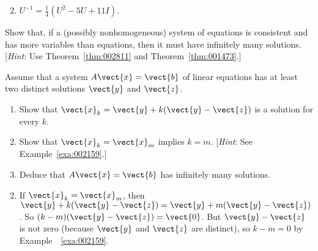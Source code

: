 \begin{multicols}{2}
\begin{supex}
\begin{enumerate}[label={\alph*.}]
\end{enumerate}
\begin{supsol}
\begin{enumerate}[label={\alph*.}]
\setcounter{enumi}{1}
\item  $U^{-1} = \frac{1}{4}(U^{2} - 5U + 11I)$.

\end{enumerate}
\end{supsol}
\end{supex}

\begin{supex}
Show that, if a (possibly nonhomogeneous) system of equations is consistent and has more variables than equations, then it must have infinitely many solutions. [\textit{Hint}: Use Theorem~\ref{thm:002811} and Theorem~\ref{thm:001473}.]

\end{supex}

\begin{supex}
Assume that a system $A\vect{x} = \vect{b}$ of linear equations has at least two distinct solutions $\vect{y}$ and $\vect{z}$.


\begin{enumerate}[label={\alph*.}]
\item Show that $\vect{x}_{k} = \vect{y} + k(\vect{y} - \vect{z})$ is a solution for every $k$.

\item Show that $\vect{x}_{k} = \vect{x}_{m}$ implies $k = m$. [\textit{Hint}: See Example~\ref{exa:002159}.]

\item Deduce that $A\vect{x} = \vect{b}$ has infinitely many solutions.

\end{enumerate}
\begin{supsol}
\begin{enumerate}[label={\alph*.}]
\setcounter{enumi}{1}
\item  If $\vect{x}_{k} = \vect{x}_{m}$, then $\vect{y} + k(\vect{y} - \vect{z}) = \vect{y} + m(\vect{y} - \vect{z})$. So $(k - m)(\vect{y} - \vect{z}) = \vect{0}$. But $\vect{y} - \vect{z}$ is not zero (because $\vect{y}$ and $\vect{z}$ are distinct), so $k - m = 0$ by Example~~\ref{exa:002159}.

\end{enumerate}
\end{supsol}
\end{supex}


\begin{supex}


\end{supex}
\end{multicols}
